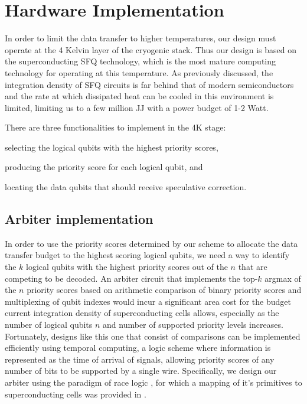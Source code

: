 \section{Hardware Implementation} %

In order to limit the data transfer to higher temperatures, our design must operate at the 4 Kelvin layer of the cryogenic stack.
Thus our design is based on the superconducting SFQ technology, which is the most mature computing technology for operating at this temperature.
As previously discussed, the integration density of SFQ circuits is far behind that of modern semiconductors and the rate at which dissipated heat can be cooled in this environment is limited, limiting us to a few million JJ with a power budget of 1-2 Watt.

There are three functionalities to implement in the 4K stage: 
\begin{enumerate*}[label=\emph{\alph*})]
  \item selecting the logical qubits with the highest priority scores,
  \item producing the priority score for each logical qubit, and
  \item locating the data qubits that should receive speculative correction.
\end{enumerate*}

\subsection{Arbiter implementation}

In order to use the priority scores determined by our scheme to allocate the data transfer budget to the highest scoring logical qubits, we need a way to identify the $k$ logical qubits with the highest priority scores out of the $n$ that are competing to be decoded.
An arbiter circuit that implements the top-$k$ argmax of the $n$ priority scores based on arithmetic comparison of binary priority scores and multiplexing of qubit indexes would incur a significant area cost for the budget current integration density of superconducting cells allows, especially as the number of logical qubits $n$ and number of supported priority levels increases.
Fortunately, designs like this one that consist of comparisons can be implemented efficiently using temporal computing, a logic scheme where information is represented as the time of arrival of signals, allowing priority scores of any number of bits to be supported by a single wire. 
Specifically, we design our arbiter using the paradigm of race logic \cite{racelogic}, for which a mapping of it's primitives to superconducting cells was provided in \cite{sfq_race}.

